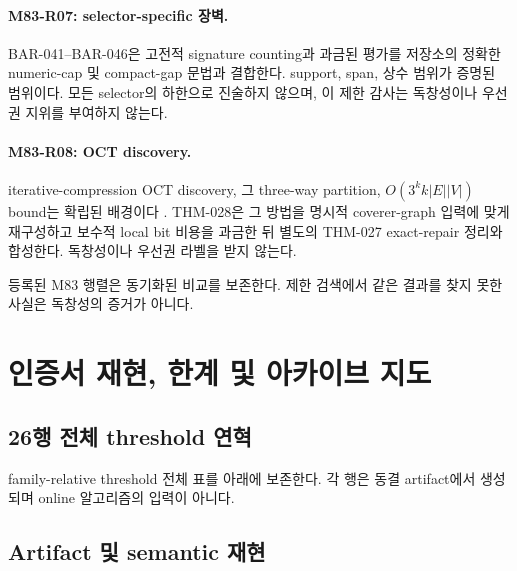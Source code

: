 \documentclass[11pt]{article}
\begin{document}
\paragraph{M83-R07: selector-specific 장벽.}
BAR-041--BAR-046은 고전적 signature counting과 과금된 평가를
저장소의 정확한 numeric-cap 및 compact-gap 문법과 결합한다. support,
span, 상수 범위가 증명된 범위이다. 모든 selector의 하한으로 진술하지
않으며, 이 제한 감사는 독창성이나 우선권 지위를 부여하지 않는다.

\paragraph{M83-R08: OCT discovery.}
iterative-compression OCT discovery, 그 three-way partition,
\(O(3^k k|E||V|)\) bound는 확립된 배경이다
\cite{lokshtanov2009oct}. THM-028은 그 방법을 명시적 coverer-graph
입력에 맞게 재구성하고 보수적 local bit 비용을 과금한 뒤 별도의
THM-027
exact-repair 정리와 합성한다. 독창성이나 우선권 라벨을 받지 않는다.

등록된 M83 행렬은 동기화된 비교를 보존한다. 제한 검색에서 같은 결과를
찾지 못한 사실은 독창성의 증거가 아니다.

\section{인증서 재현, 한계 및 아카이브 지도}
\label{app:finite-reproduction}

\subsection{26행 전체 threshold 연혁}

family-relative threshold 전체 표를 아래에 보존한다. 각 행은 동결
artifact에서 생성되며 online 알고리즘의 입력이 아니다.



\subsection{Artifact 및 semantic 재현}
\end{document}
